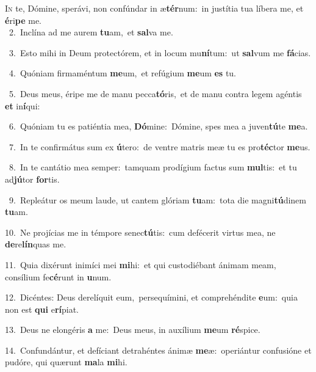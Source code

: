 \lettrine{\initial\textcolor{\initialcolor}{I}}{n} te, Dómine, sperávi, non confúndar in æ\-\textbf{tér}\-num:~\star in justítia tua líbera me, et \textbf{é}\-ri\textbf{pe} me.\\
{\numbfont\textcolor{\numbcolor}{~2.}}~Inclína ad me aurem \textbf{tu}\-am,~\star et \textbf{sal}\-va me.\par
{\numbfont\textcolor{\numbcolor}{~3.}}~Esto mihi in Deum protectórem, et in locum mu\-\textbf{ní}\-tum:~\star ut \textbf{sal}\-vum me \textbf{fá}\-cias.\par
{\numbfont\textcolor{\numbcolor}{~4.}}~Quóniam firmaméntum \textbf{me}\-um,~\star et refúgium \textbf{me}\-um \textbf{es} tu.\par
{\numbfont\textcolor{\numbcolor}{~5.}}~Deus meus, éripe me de manu pecca\-\textbf{tó}\-ris,~\star et de manu contra legem agéntis \textbf{et} in\-\textbf{í}\-qui:\par
{\numbfont\textcolor{\numbcolor}{~6.}}~Quóniam tu es patiéntia mea, \textbf{Dó}\-mine:~\star Dómine, spes mea a juven\-\textbf{tú}\-te \textbf{me}\-a.\par
{\numbfont\textcolor{\numbcolor}{~7.}}~In te confirmátus sum ex \textbf{ú}\-tero:~\star de ventre matris meæ tu es pro\-\textbf{téc}\-tor \textbf{me}\-us.\par
{\numbfont\textcolor{\numbcolor}{~8.}}~In te cantátio mea semper:~\dagger tamquam prodígium factus sum \textbf{mul}\-tis:~\star et tu ad\-\textbf{jú}\-tor \textbf{for}\-tis.\par
{\numbfont\textcolor{\numbcolor}{~9.}}~Repleátur os meum laude, ut cantem glóriam \textbf{tu}\-am:~\star tota die magni\-\textbf{tú}\-dinem \textbf{tu}\-am.\par
{\numbfont\textcolor{\numbcolor}{10.}}~Ne projícias me in témpore senec\-\textbf{tú}\-tis:~\star cum defécerit virtus mea, ne \textbf{de}\-re\-\textbf{lín}\-quas me.\par
{\numbfont\textcolor{\numbcolor}{11.}}~Quia dixérunt inimíci mei \textbf{mi}\-hi:~\star et qui custodiébant ánimam meam, consílium fe\-\textbf{cé}\-runt in \textbf{u}\-num.\par
{\numbfont\textcolor{\numbcolor}{12.}}~Dicéntes: Deus derelíquit eum,~\dagger persequímini, et comprehéndite \textbf{e}\-um:~\star quia non est \textbf{qui} e\-\textbf{rí}\-piat.\par
{\numbfont\textcolor{\numbcolor}{13.}}~Deus ne elongéris \textbf{a} me:~\star Deus meus, in auxílium \textbf{me}\-um \textbf{ré}\-spice.\par
{\numbfont\textcolor{\numbcolor}{14.}}~Confundántur, et defíciant detrahéntes ánimæ \textbf{me}\-æ:~\star operiántur confusióne et pudóre, qui quærunt \textbf{ma}\-la \textbf{mi}\-hi.\par
